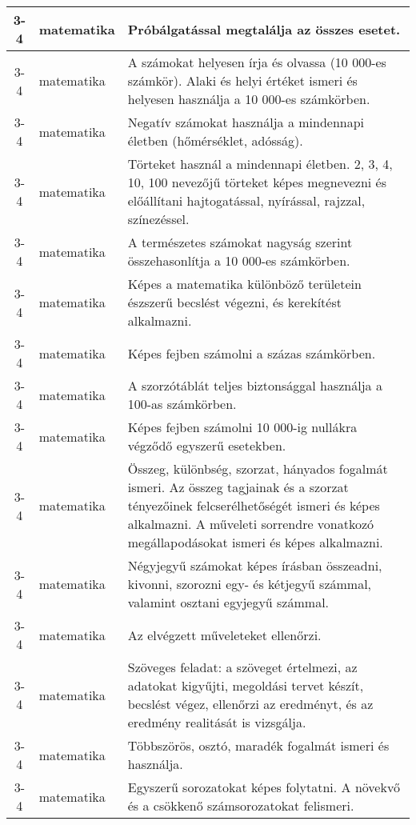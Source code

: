 \begin{small}
\begin{longtable}{c | p{2cm} |  p{11cm} }
              3-4 & matematika & Próbálgatással megtalálja az összes esetet. \\ \hline
              3-4 & matematika & A számokat helyesen írja és olvassa (10 000-es számkör). Alaki és helyi értéket ismeri és helyesen használja a 10 000-es számkörben. \\ \hline
              3-4 & matematika & Negatív számokat használja a mindennapi életben (hőmérséklet, adósság). \\ \hline
              3-4 & matematika & Törteket használ a mindennapi életben. 2, 3, 4, 10, 100 nevezőjű törteket képes megnevezni és előállítani hajtogatással, nyírással, rajzzal, színezéssel. \\ \hline
              3-4 & matematika & A természetes számokat nagyság szerint összehasonlítja a 10 000-es számkörben. \\ \hline
              3-4 & matematika & Képes a matematika különböző területein észszerű becslést végezni, és kerekítést alkalmazni. \\ \hline
              3-4 & matematika & Képes fejben számolni a százas számkörben. \\ \hline
              3-4 & matematika & A szorzótáblát teljes biztonsággal használja a 100-as számkörben. \\ \hline
              3-4 & matematika & Képes fejben számolni 10 000-ig nullákra végződő egyszerű esetekben. \\ \hline
              3-4 & matematika & Összeg, különbség, szorzat, hányados fogalmát ismeri. Az összeg tagjainak és a szorzat tényezőinek felcserélhetőségét ismeri és képes alkalmazni. A műveleti sorrendre vonatkozó megállapodásokat ismeri és képes alkalmazni. \\ \hline
              3-4 & matematika & Négyjegyű számokat képes írásban összeadni, kivonni, szorozni egy- és kétjegyű számmal, valamint osztani egyjegyű számmal. \\ \hline
              3-4 & matematika & Az elvégzett műveleteket ellenőrzi. \\ \hline
              3-4 & matematika & Szöveges feladat: a szöveget értelmezi, az adatokat kigyűjti, megoldási tervet készít, becslést végez, ellenőrzi az eredményt, és az eredmény realitását is vizsgálja. \\ \hline
              3-4 & matematika & Többszörös, osztó, maradék fogalmát ismeri és használja. \\ \hline
              3-4 & matematika & Egyszerű sorozatokat képes folytatni. A növekvő és a csökkenő számsorozatokat felismeri. \\ \hline

\end{longtable}
\end{small}

